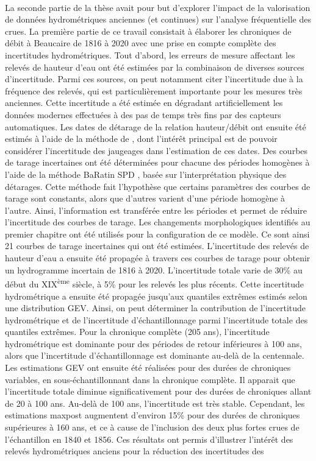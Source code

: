 	\paragraph{} La seconde partie de la thèse avait pour but d'explorer l'impact de la valorisation de données hydrométriques anciennes (et continues) sur l'analyse fréquentielle des crues. La première partie de ce travail consistait à élaborer les chroniques de débit à Beaucaire de 1816 à 2020 avec une prise en compte complète des incertitudes hydrométriques. Tout d'abord, les erreurs de mesure affectant les relevés de hauteur d'eau ont été estimées par la combinaison de diverses sources d'incertitude. Parmi ces sources, on peut notamment citer l'incertitude due à la fréquence des relevés, qui est particulièrement importante pour les mesures très anciennes. Cette incertitude a été estimée en dégradant artificiellement les données modernes effectuées à des pas de temps très fins par des capteurs automatiques. Les dates de détarage de la relation hauteur/débit ont ensuite été estimés à l'aide de la méthode de \citet{darienzo_detection_2021}, dont l'intérêt principal est de pouvoir considérer l'incertitude des jaugeages dans l'estimation de ces dates. Des courbes de tarage incertaines ont été déterminées pour chacune des périodes homogènes à l'aide de la méthode BaRatin SPD \citep{mansanarez_shift_2019}, basée sur l'interprétation physique des détarages. Cette méthode fait l'hypothèse que certains paramètres des courbes de tarage sont constants, alors que d'autres varient d'une période homogène à l'autre. Ainsi, l'information est transférée entre les périodes et permet de réduire l'incertitude des courbes de tarage. Les changements morphologiques identifiés au premier chapitre ont été utilisés pour la configuration de ce modèle. Ce sont ainsi 21 courbes de tarage incertaines qui ont été estimées. L'incertitude des relevés de hauteur d'eau a ensuite été propagée à travers ces courbes de tarage pour obtenir un hydrogramme incertain de 1816 à 2020. L'incertitude totale varie de 30\% au début du XIX\textsuperscript{ème} siècle, à 5\% pour les relevés les plus récents. Cette incertitude hydrométrique a ensuite été propagée jusqu'aux quantiles extrêmes estimés selon une distribution GEV. Ainsi, on peut déterminer la contribution de l'incertitude hydrométrique et de l'incertitude d'échantillonnage parmi l'incertitude totale des quantiles extrêmes. Pour la chronique complète (205 ans), l'incertitude hydrométrique est dominante pour des périodes de retour inférieures à 100 ans, alors que l'incertitude d'échantillonnage est dominante au-delà de la centennale. Les estimations GEV ont ensuite été réalisées pour des durées de chroniques variables, en sous-échantillonnant dans la chronique complète. Il apparait que l'incertitude totale diminue significativement pour des durées de chroniques allant de 20 à 100 ans. Au-delà de 100 ans, l'incertitude est très stable. Cependant, les estimations maxpost augmentent d'environ 15\% pour des durées de chroniques supérieures à 160 ans, et ce à cause de l'inclusion des deux plus fortes crues de l'échantillon en 1840 et 1856. Ces résultats ont permis d'illustrer l'intérêt des relevés hydrométriques anciens pour la réduction des incertitudes des 